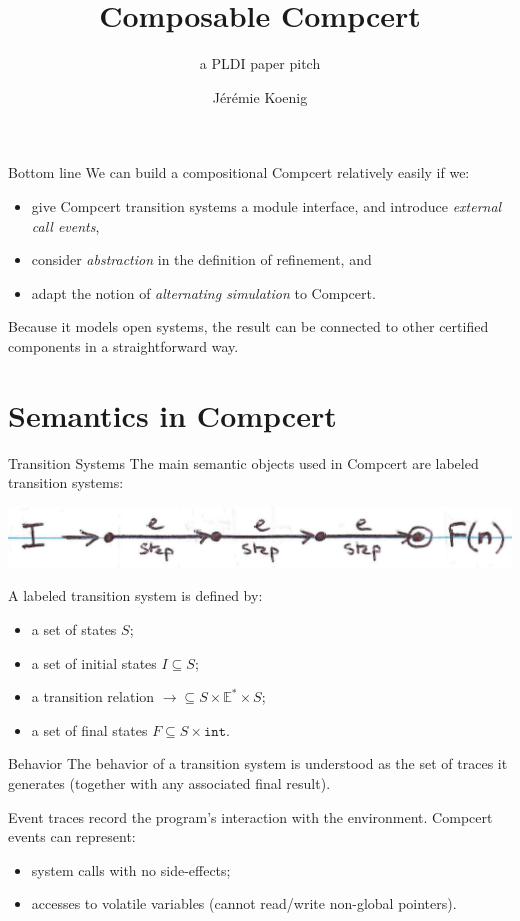 \documentclass[handout]{beamer}
\title{Composable Compcert}
\subtitle{a PLDI paper pitch}
\author{J\'er\'emie Koenig}
\newcommand{\kw}[1]{\texttt{#1}}
\begin{document}
\begin{frame}
\titlepage
\end{frame}

\begin{frame}{Bottom line} %
We can build a compositional Compcert
relatively easily if we:
\begin{itemize}
\item give Compcert transition systems a module interface,
  and introduce \emph{external call events},
\item
  consider \emph{abstraction} in the definition of refinement, and
\item
  adapt the notion of \emph{alternating simulation}
  to Compcert.
\end{itemize}
Because it models open systems,
the result can be connected to
other certified components
in a straightforward way.
\end{frame}

\section{Semantics in Compcert}

\begin{frame}{Transition Systems} %
The main semantic objects used in Compcert
are labeled transition systems:
\begin{center}
  \includegraphics[scale=.65]{figs/trsys}
\end{center}
A labeled transition system is defined by:
\begin{itemize}
  \item a set of states $S$;
  \item a set of initial states $I \subseteq S$;
  \item a transition relation ${\rightarrow} \subseteq S \times \mathbb{E}^* \times S$;
  \item a set of final states $F \subseteq S \times \kw{int}$.
\end{itemize}
\end{frame}

\begin{frame}{Behavior} %
The behavior of a transition system is understood as
the set of traces it generates
(together with any associated final result).

Event traces record the program's interaction with the environment.
Compcert events can represent:
\begin{itemize}
  \item system calls with no side-effects;
  \item accesses to volatile variables (cannot read/write non-global pointers).
\end{itemize}
\end{frame}
\end{document}
